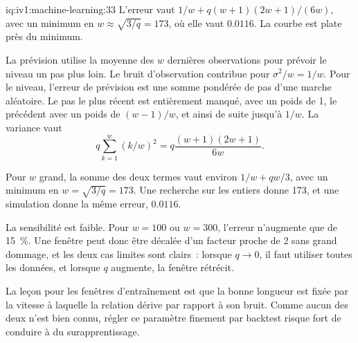 \begin{solution}{iq:iv1:machine-learning:33}
L'erreur vaut $1/w + q(w + 1)(2w + 1)/(6w)$, avec un minimum en $w \approx \sqrt{3/q} = 173$, où elle vaut $0.0116$. La courbe est plate près du minimum.

La prévision utilise la moyenne des $w$ dernières observations pour prévoir le niveau un pas plus loin. Le bruit d'observation contribue pour $\sigma^2/w = 1/w$. Pour le niveau, l'erreur de prévision est une somme pondérée de pas d'une marche aléatoire. Le pas le plus récent est entièrement manqué, avec un poids de 1, le précédent avec un poids de $(w - 1)/w$, et ainsi de suite jusqu'à $1/w$. La variance vaut
\[
q\sum_{k = 1}^{w}(k/w)^2 = q\frac{(w + 1)(2w + 1)}{6w}.
\]

Pour $w$ grand, la somme des deux termes vaut environ $1/w + qw/3$, avec un minimum en $w = \sqrt{3/q} = 173$. Une recherche sur les entiers donne 173, et une simulation donne la même erreur, $0.0116$.

La sensibilité est faible. Pour $w = 100$ ou $w = 300$, l'erreur n'augmente que de 15~\%. Une fenêtre peut donc être décalée d'un facteur proche de 2 sans grand dommage, et les deux cas limites sont clairs~: lorsque $q \to 0$, il faut utiliser toutes les données, et lorsque $q$ augmente, la fenêtre rétrécit.

La leçon pour les fenêtres d'entraînement est que la bonne longueur est fixée par la vitesse à laquelle la relation dérive par rapport à son bruit. Comme aucun des deux n'est bien connu, régler ce paramètre finement par backtest risque fort de conduire à du surapprentissage.



\end{solution}

